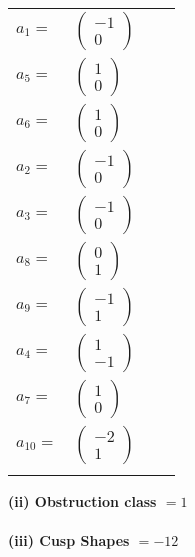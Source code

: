\documentclass[1p]{elsarticle_modified}
\theoremstyle{definition}
\begin{document}
\begin{tabular}{m{7pt} m{180pt} m{7pt} m{180pt} }
\flushright $a_{1}=$&$\begin{pmatrix}-1\\0\end{pmatrix}$ \\
\flushright $a_{5}=$&$\begin{pmatrix}1\\0\end{pmatrix}$ \\
\flushright $a_{6}=$&$\begin{pmatrix}1\\0\end{pmatrix}$ \\
\flushright $a_{2}=$&$\begin{pmatrix}-1\\0\end{pmatrix}$ \\
\flushright $a_{3}=$&$\begin{pmatrix}-1\\0\end{pmatrix}$ \\
\flushright $a_{8}=$&$\begin{pmatrix}0\\1\end{pmatrix}$ \\
\flushright $a_{9}=$&$\begin{pmatrix}-1\\1\end{pmatrix}$ \\
\flushright $a_{4}=$&$\begin{pmatrix}1\\-1\end{pmatrix}$ \\
\flushright $a_{7}=$&$\begin{pmatrix}1\\0\end{pmatrix}$ \\
\flushright $a_{10}=$&$\begin{pmatrix}-2\\1\end{pmatrix}$\\&\end{tabular}
\flushleft \textbf{(ii) Obstruction class $= 1$}\\~\\
\flushleft \textbf{(iii) Cusp Shapes $= -12$}\\~\\
\end{document}
